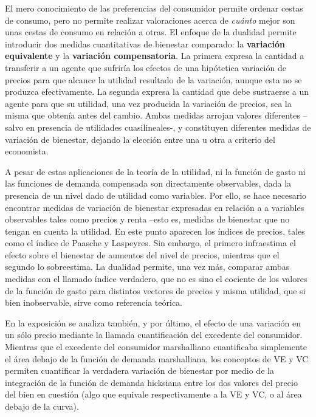 \documentclass{nuevotema}
\begin{document}
El mero conocimiento de las preferencias del consumidor permite ordenar cestas de consumo, pero no permite realizar valoraciones acerca de \textit{cuánto} mejor son unas cestas de consumo en relación a otras. El enfoque de la dualidad permite introducir dos medidas cuantitativas de bienestar comparado: la \textbf{variación equivalente} y la \textbf{variación compensatoria}. La primera expresa la cantidad a transferir a un agente que sufriría los efectos de una hipótetica variación de precios para que alcance la utilidad resultado de la variación, aunque esta no se produzca efectivamente. La segunda expresa la cantidad que debe sustraerse a un agente para que su utilidad, una vez producida la variación de precios, sea la misma que obtenía antes del cambio. Ambas medidas arrojan valores diferentes --salvo en presencia de utilidades cuasilineales-, y constituyen diferentes medidas de variación de bienestar, dejando la elección entre una u otra a criterio del economista.

A pesar de estas aplicaciones de la teoría de la utilidad, ni la función de gasto ni las funciones de demanda compensada son directamente observables, dada la presencia de un nivel dado de utilidad como variables. Por ello, se hace necesario encontrar medidas de variación de bienestar expresadas en relación a  a variables observables tales como precios y renta --esto es, medidas de bienestar que no tengan en cuenta la utilidad. En este punto aparecen los índices de precios, tales como el índice de Paasche y Laspeyres. Sin embargo, el primero infraestima el efecto sobre el bienestar de aumentos del nivel de precios, mientras que el segundo lo sobreestima. La dualidad permite, una vez más, comparar ambas medidas con el llamado índice verdadero, que no es sino el cociente de los valores de la función de gasto para distintos vectores de precios y misma utilidad, que si bien inobservable, sirve como referencia teórica.

En la exposición se analiza también, y por último, el efecto de una variación en un sólo precio mediante la llamada cuantificación del excedente del consumidor. Mientras que el excedente del consumidor marshalliano cuantificaba simplemente el área debajo de la función de demanda marshalliana, los conceptos de VE y VC permiten cuantificar la verdadera variación de bienestar por medio de la integración de la función de demanda hicksiana entre los dos valores del precio del bien en cuestión (algo que equivale respectivamente a la VE y VC, o al área debajo de la curva).
\end{document}
